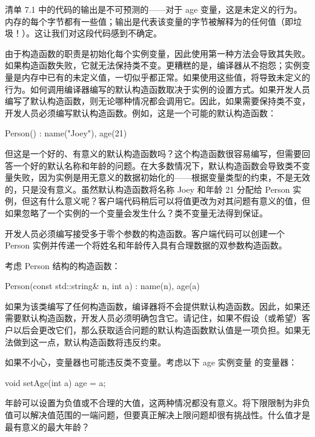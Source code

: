 清单 7.1 中的代码的输出是不可预测的——对于 age 变量，这是未定义的行为。内存的每个字节都有一些值；输出是代表该变量的字节被解释为的任何值（即垃圾！）。这让我们对这段代码感到不确定。


由于构造函数的职责是初始化每个实例变量，因此使用第一种方法会导致其失败。如果构造函数失败，它就无法保持类不变。更糟糕的是，编译器从不抱怨；实例变量是内存中已有的未定义值，一切似乎都正常。如果使用这些值，将导致未定义的行为。如何调用编译器编写的默认构造函数取决于实例的设置方式。如果开发人员编写了默认构造函数，则无论哪种情况都会调用它。因此，如果需要保持类不变，开发人员必须编写默认构造函数。例如，这是一个可能的默认构造函数：

\begin{cpp}
Person() : name("Joey"), age(21) {}
\end{cpp}

但这是一个好的、有意义的默认构造函数吗？这个构造函数很容易编写，但需要回答一个好的默认名称和年龄的问题。在大多数情况下，默认构造函数会导致类不变量失败，因为实例是用无意义的数据初始化的——根据变量类型的约束，不是无效的，只是没有意义。虽然默认构造函数将名称 Joey 和年龄 21 分配给 Person 实例，但这有什么意义呢？客户端代码稍后可以将值更改为对其问题有意义的值，但如果忽略了一个实例的一个变量会发生什么？类不变量无法得到保证。

开发人员必须编写接受多于零个参数的构造函数。客户端代码可以创建一个 Person 实例并传递一个将姓名和年龄传入具有合理数据的双参数构造函数。

考虑 Person 结构的构造函数：

\begin{cpp}
Person(const std::string& n, int a) : name(n), age(a) {}
\end{cpp}

如果为该类编写了任何构造函数，编译器将不会提供默认构造函数。因此，如果还需要默认构造函数，开发人员必须明确包含它。请记住，如果不假设（或希望）客户以后会更改它们，那么获取适合问题的默认构造函数默认值是一项负担。如果无法做到这一点，默认构造函数将违反约束。

如果不小心，变量器也可能违反类不变量。考虑以下 age 实例变量 的变量器：

\begin{cpp}
void setAge(int a) { age = a; }
\end{cpp}

年龄可以设置为负值或不合理的大值，这两种情况都没有意义。将下限限制为非负值可以解决值范围的一端问题，但要真正解决上限问题却很有挑战性。什么值才是最有意义的最大年龄？

